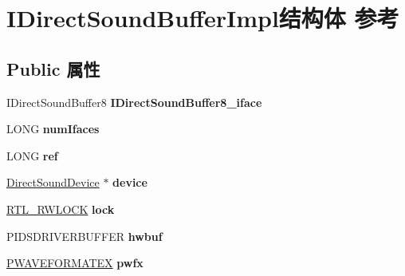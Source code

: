 \hypertarget{struct_i_direct_sound_buffer_impl}{}\section{I\+Direct\+Sound\+Buffer\+Impl结构体 参考}
\label{struct_i_direct_sound_buffer_impl}
\subsection*{Public 属性}
\begin{DoxyCompactItemize}
\item 
\mbox{\label{struct_i_direct_sound_buffer_impl_a91bc17186bc745305ec799290aac3dd0}} 
I\+Direct\+Sound\+Buffer8 {\bfseries I\+Direct\+Sound\+Buffer8\+\_\+iface}
\item 
\mbox{\label{struct_i_direct_sound_buffer_impl_ac85939dae6f2d76e5685edfc2cfd9978}} 
L\+O\+NG {\bfseries num\+Ifaces}
\item 
\mbox{\label{struct_i_direct_sound_buffer_impl_aece777b71cd42a7ca4f86cb7e36bed23}} 
L\+O\+NG {\bfseries ref}
\item 
\mbox{\label{struct_i_direct_sound_buffer_impl_a797f6cba9037cf9e963a5fae2d7dd421}} 
\hyperlink{struct_direct_sound_device}{Direct\+Sound\+Device} $\ast$ {\bfseries device}
\item 
\mbox{\label{struct_i_direct_sound_buffer_impl_aacd407cfc0bb26c892e20cfd46c35e1a}} 
\hyperlink{struct___r_t_l___r_w_l_o_c_k}{R\+T\+L\+\_\+\+R\+W\+L\+O\+CK} {\bfseries lock}
\item 
\mbox{\label{struct_i_direct_sound_buffer_impl_a61b61a541aef9a49355a8c31a0dc69d2}} 
P\+I\+D\+S\+D\+R\+I\+V\+E\+R\+B\+U\+F\+F\+ER {\bfseries hwbuf}
\item 
\mbox{\label{struct_i_direct_sound_buffer_impl_a5bfde000a37105f45079a9f10d0eab45}} 
\hyperlink{struct___w_a_v_e_f_o_r_m_a_t_e_x}{P\+W\+A\+V\+E\+F\+O\+R\+M\+A\+T\+EX} {\bfseries pwfx}
\item 

\end{DoxyCompactItemize}
